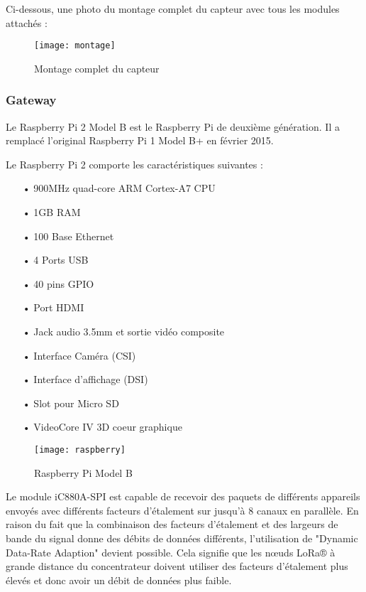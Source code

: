 Ci-dessous, une photo du montage complet du capteur avec tous les modules attachés :
\begin{figure}[!h]
	\centering
	\texttt{[image: montage]}
	\caption{Montage complet du capteur}
	\label{}
\end{figure}

\newpage
\subsubsection{Gateway}

Le Raspberry Pi 2 Model B est le Raspberry Pi de deuxième génération. Il a remplacé l'original Raspberry Pi 1 Model B+ en février 2015.

Le Raspberry Pi 2 comporte les caractéristiques suivantes :

\begin{itemize}
	\item[•] 900MHz quad-core ARM Cortex-A7 CPU
	\item[•] 1GB RAM
	\item[•] 100 Base Ethernet
	\item[•] 4 Ports USB
	\item[•] 40 pins GPIO
	\item[•] Port HDMI
	\item[•] Jack audio 3.5mm et sortie vidéo composite
	\item[•] Interface Caméra (CSI)
	\item[•] Interface d'affichage (DSI)
	\item[•] Slot pour Micro SD
	\item[•] VideoCore IV 3D coeur graphique
\end{itemize}



\begin{figure}[!h]
	\centering
	\texttt{[image: raspberry]}
	\caption{Raspberry Pi Model B}
	\label{raspberry}
\end{figure}

\newpage
Le module iC880A-SPI est capable de recevoir des paquets de différents appareils envoyés avec différents facteurs d'étalement sur jusqu'à 8 canaux en parallèle. En raison du fait que la combinaison des facteurs d'étalement et des largeurs de bande du signal donne des débits de données différents, l'utilisation de "Dynamic Data-Rate Adaption" devient possible. Cela signifie que les nœuds LoRa® à grande distance du concentrateur doivent utiliser des facteurs d'étalement plus élevés et donc avoir un débit de données plus faible.

